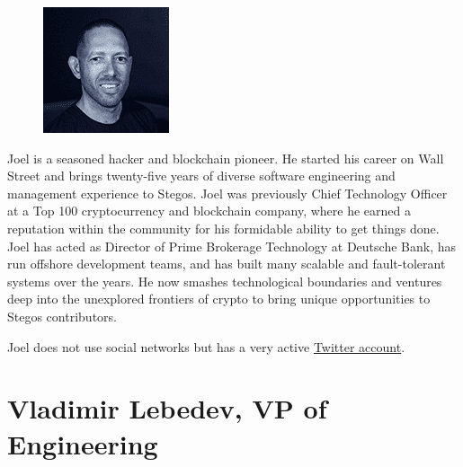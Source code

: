 \documentclass[8pt,fleqn,openany]{book}
\begin{document}
	{
		\setlength\intextsep{0pt}
		\begin{figure}
			\includegraphics{images/team/team-1.png}
		\end{figure}
		
		Joel is a seasoned hacker and blockchain pioneer. He started his career on Wall Street and brings twenty-five years of diverse software engineering and management experience to Stegos. Joel was previously Chief Technology Officer at a Top 100 cryptocurrency and blockchain company, where he earned a reputation within the community for his formidable ability to get things done. Joel has acted as Director of Prime Brokerage Technology at Deutsche Bank, has run offshore development teams, and has built many scalable and fault-tolerant systems over the years. He now smashes technological boundaries and ventures deep into the unexplored frontiers of crypto to bring unique opportunities to Stegos contributors. 
		
		Joel does not use social networks but has a very active \href{http://twitter.com/joelreymont}{Twitter account}.
	}
	
	\section{Vladimir Lebedev, VP of Engineering}
	
\end{document}
